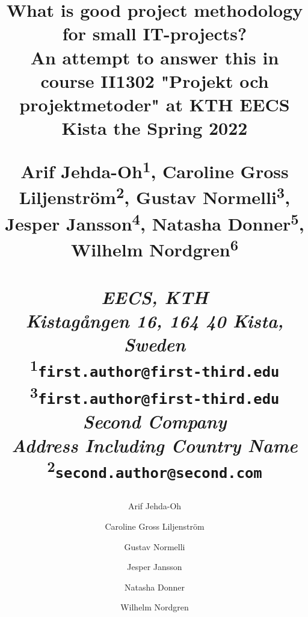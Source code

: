 \title{
    What is good project methodology for small IT-projects?\\
{\normalsize An attempt to answer this in course II1302 "Projekt och projektmetoder"
at KTH EECS Kista the Spring 2022}

\begin{center}
    \large{ 
        Arif Jehda-Oh\textsuperscript{1}, Caroline Gross Liljenström\textsuperscript{2}, Gustav Normelli\textsuperscript{3}, Jesper Jansson\textsuperscript{4}, Natasha Donner\textsuperscript{5}, Wilhelm Nordgren\textsuperscript{6}\\
        \textit{\\EECS, KTH\\
                Kistagången 16, 164 40 Kista, Sweden\\}
        \textsuperscript{1}\texttt{first.author@first-third.edu}\\
        \textsuperscript{3}\texttt{first.author@first-third.edu}\\
        \textit{Second Company\\
        Address Including Country Name\\}
        \textsuperscript{2}\texttt{second.author@second.com}
    }
\end{center}
}

\author{Arif Jehda-Oh}
\author{Caroline Gross Liljenström}
\author{Gustav Normelli}
\author{Jesper Jansson}
\author{Natasha Donner}
\author{Wilhelm Nordgren}




\maketitle